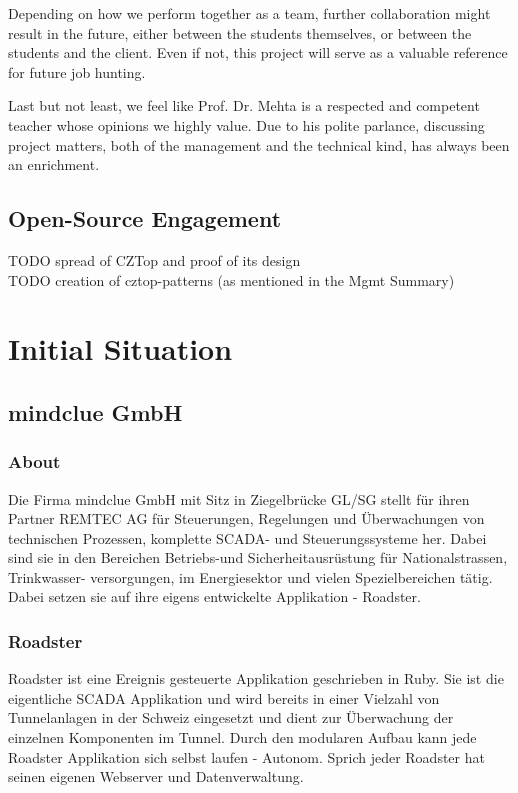 Depending on how we perform together as a team, further collaboration might
result in the future, either between the students themselves, or between the
students and the client. Even if not, this project will serve as a valuable
reference for future job hunting.

Last but not least, we feel like Prof. Dr. Mehta is a respected and competent
teacher whose opinions we highly value. Due to his polite parlance, discussing
project matters, both of the management and the technical kind, has always been
an enrichment.

\subsection{Open-Source Engagement}
TODO spread of CZTop and proof of its design\\
TODO creation of cztop-patterns (as mentioned in the Mgmt Summary)\\

\section{Initial Situation}

\subsection{mindclue GmbH}
\subsubsection{About}
Die Firma mindclue GmbH mit Sitz in Ziegelbrücke GL/SG stellt für ihren
Partner REMTEC AG für Steuerungen, Regelungen und Überwachungen von technischen Prozessen,
komplette SCADA- und Steuerungssysteme her. Dabei sind sie in den Bereichen
Betriebs-und Sicherheitausrüstung für Nationalstrassen, Trinkwasser-
versorgungen, im Energiesektor und vielen Spezielbereichen tätig.
Dabei setzen sie auf ihre eigens entwickelte Applikation - Roadster.

\subsubsection{Roadster}
Roadster ist eine Ereignis gesteuerte Applikation geschrieben in Ruby.
Sie ist die eigentliche SCADA Applikation und wird bereits in einer Vielzahl von
Tunnelanlagen in der Schweiz eingesetzt und dient zur Überwachung der einzelnen Komponenten im Tunnel.
Durch den modularen Aufbau kann jede Roadster Applikation sich selbst laufen - Autonom.
Sprich jeder Roadster hat seinen eigenen Webserver und Datenverwaltung.

